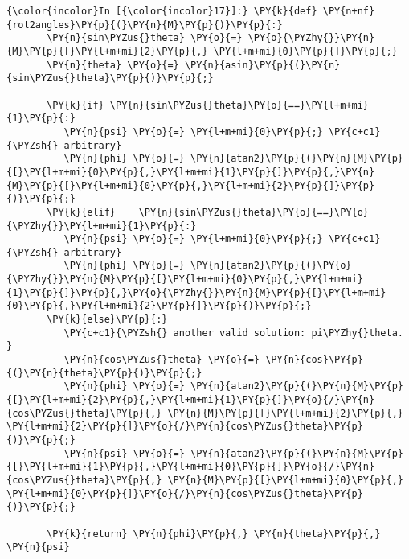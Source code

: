 \documentclass[a4paper]{scrreprt}
\begin{document}
\begin{Verbatim}[commandchars=\\\{\},samepage=true]
{\color{incolor}In [{\color{incolor}17}]:} \PY{k}{def} \PY{n+nf}{rot2angles}\PY{p}{(}\PY{n}{M}\PY{p}{)}\PY{p}{:}
	   \PY{n}{sin\PYZus{}theta} \PY{o}{=} \PY{o}{\PYZhy{}}\PY{n}{M}\PY{p}{[}\PY{l+m+mi}{2}\PY{p}{,} \PY{l+m+mi}{0}\PY{p}{]}\PY{p}{;}     
	   \PY{n}{theta} \PY{o}{=} \PY{n}{asin}\PY{p}{(}\PY{n}{sin\PYZus{}theta}\PY{p}{)}\PY{p}{;}     

	   \PY{k}{if} \PY{n}{sin\PYZus{}theta}\PY{o}{==}\PY{l+m+mi}{1}\PY{p}{:}
	      \PY{n}{psi} \PY{o}{=} \PY{l+m+mi}{0}\PY{p}{;} \PY{c+c1}{\PYZsh{} arbitrary}
	      \PY{n}{phi} \PY{o}{=} \PY{n}{atan2}\PY{p}{(}\PY{n}{M}\PY{p}{[}\PY{l+m+mi}{0}\PY{p}{,}\PY{l+m+mi}{1}\PY{p}{]}\PY{p}{,}\PY{n}{M}\PY{p}{[}\PY{l+m+mi}{0}\PY{p}{,}\PY{l+m+mi}{2}\PY{p}{]}\PY{p}{)}\PY{p}{;}     
	   \PY{k}{elif}    \PY{n}{sin\PYZus{}theta}\PY{o}{==}\PY{o}{\PYZhy{}}\PY{l+m+mi}{1}\PY{p}{:}
	      \PY{n}{psi} \PY{o}{=} \PY{l+m+mi}{0}\PY{p}{;} \PY{c+c1}{\PYZsh{} arbitrary}
	      \PY{n}{phi} \PY{o}{=} \PY{n}{atan2}\PY{p}{(}\PY{o}{\PYZhy{}}\PY{n}{M}\PY{p}{[}\PY{l+m+mi}{0}\PY{p}{,}\PY{l+m+mi}{1}\PY{p}{]}\PY{p}{,}\PY{o}{\PYZhy{}}\PY{n}{M}\PY{p}{[}\PY{l+m+mi}{0}\PY{p}{,}\PY{l+m+mi}{2}\PY{p}{]}\PY{p}{)}\PY{p}{;}        
	   \PY{k}{else}\PY{p}{:}
	      \PY{c+c1}{\PYZsh{} another valid solution: pi\PYZhy{}theta.             }
	      \PY{n}{cos\PYZus{}theta} \PY{o}{=} \PY{n}{cos}\PY{p}{(}\PY{n}{theta}\PY{p}{)}\PY{p}{;} 
	      \PY{n}{phi} \PY{o}{=} \PY{n}{atan2}\PY{p}{(}\PY{n}{M}\PY{p}{[}\PY{l+m+mi}{2}\PY{p}{,}\PY{l+m+mi}{1}\PY{p}{]}\PY{o}{/}\PY{n}{cos\PYZus{}theta}\PY{p}{,} \PY{n}{M}\PY{p}{[}\PY{l+m+mi}{2}\PY{p}{,} \PY{l+m+mi}{2}\PY{p}{]}\PY{o}{/}\PY{n}{cos\PYZus{}theta}\PY{p}{)}\PY{p}{;}
	      \PY{n}{psi} \PY{o}{=} \PY{n}{atan2}\PY{p}{(}\PY{n}{M}\PY{p}{[}\PY{l+m+mi}{1}\PY{p}{,}\PY{l+m+mi}{0}\PY{p}{]}\PY{o}{/}\PY{n}{cos\PYZus{}theta}\PY{p}{,} \PY{n}{M}\PY{p}{[}\PY{l+m+mi}{0}\PY{p}{,} \PY{l+m+mi}{0}\PY{p}{]}\PY{o}{/}\PY{n}{cos\PYZus{}theta}\PY{p}{)}\PY{p}{;}

	   \PY{k}{return} \PY{n}{phi}\PY{p}{,} \PY{n}{theta}\PY{p}{,} \PY{n}{psi}
\end{Verbatim}


\subsection{}\label{d}
\end{document}
